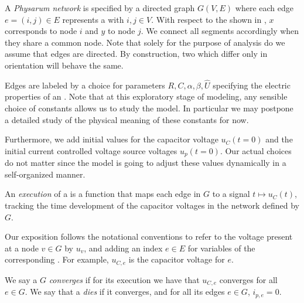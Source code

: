   A {\em Physarum network\/} is specified by a directed graph $G(V,E)$ where each edge $e = (i,j) \in E$ represents a \Pe with $i,j \in V$. With respect to the \Pe shown in , $x$ corresponds to node $i$ and $y$ to node $j$. We connect all segments accordingly when they share a common node. Note that solely for the purpose of analysis do we assume that edges are directed. By construction, two \Pes which differ only in orientation will behave the same.

  Edges are labeled by a choice for parameters $R,C,\alpha,\beta,\hat{U}$ specifying the electric properties of an \Pe. Note that at this exploratory stage of modeling, any sensible choice of constants allows us to study the model. In particular we may postpone a detailed study of the physical meaning of these constants for now. 

  Furthermore, we add initial values for the capacitor voltage $u_C(t=0)$ and the initial current controlled voltage source voltages $u_p(t=0)$. Our actual choices do not matter since the model is going to adjust these values dynamically in a self-organized manner. 

  An \emph{execution} of a \Pn is a function that maps each edge in $G$ to a signal $t \mapsto u_C(t)$, \ie tracking the time development of the capacitor voltages in the network defined by $G$.

  Our exposition follows the notational conventions to refer to the voltage present at a node $v \in G$ by $u_v$, and adding an index $e \in E$ for variables of the corresponding \Pe. For example, $u_{C,e}$ is the capacitor voltage for \Pe $e$.

  We say a \Pn $G$ \emph{converges} if for its execution we have that $u_{C,e}$ converges for all $e \in G$. We say that a \Pn \emph{dies} if it converges, and for all its edges $e \in G$, $i_{p,e} = 0$.
  
